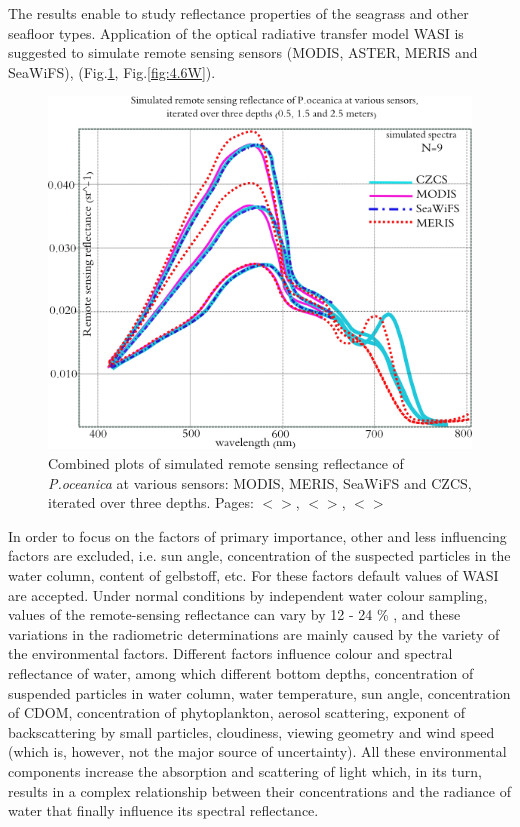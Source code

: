 \documentclass[11pt]{article}
\begin{document}
The results enable to study reflectance properties of the seagrass and other
seafloor types. Application of the optical radiative transfer model WASI is suggested to simulate
remote sensing sensors (\ac{MODIS}, \ac{ASTER}, \ac{MERIS} and \ac{SeaWiFS}), (Fig.\ref{fig:4.6}, Fig.\ref{fig:4.6W}).\label{page-33}

\begin{figure}
	\centering
	\includegraphics[scale=0.45]{Sensors.png}
	\caption{Combined plots of simulated remote sensing reflectance of \textit{P.oceanica} at various sensors: \ac{MODIS}, \ac{MERIS}, \ac{SeaWiFS} and \ac{CZCS}, iterated over three depths. Pages: $<$\pageref{page-21}$>$, $<$\pageref{page-22}$>$, $<$\pageref{page-33}$>$}
	\label{fig:4.6}
\end{figure}

In order to focus on the factors of primary importance, other and less influencing factors are excluded,
i.e. sun angle, concentration of the suspected particles in the water column, content of gelbstoff, etc.
For these factors default values of \ac{WASI} are accepted.
Under normal conditions by independent water colour sampling, values of the remote-sensing
reflectance can vary by 12 - 24 \% \cite{Toole00}\label{Toole00}, and these variations in the radiometric
determinations are mainly caused by the variety of the environmental factors.
Different factors influence colour and spectral reflectance of water, among which different bottom
depths, concentration of suspended particles in water column, water temperature, sun angle,
concentration of \ac{CDOM}, concentration of phytoplankton,
aerosol scattering, exponent of backscattering by small particles, cloudiness, viewing geometry and
wind speed (which is, however, not the major source of uncertainty). All these environmental
components increase the absorption and scattering of light which, in its turn, results in a complex
relationship between their concentrations and the radiance of water that finally influence its spectral
reflectance.
\end{document}
